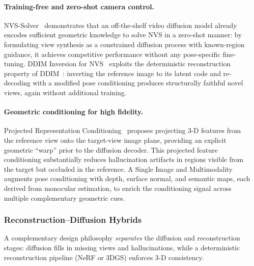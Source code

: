 \paragraph{Training-free and zero-shot camera control.}
NVS-Solver~\citep{you2024nvssolver} demonstrates that an off-the-shelf video
diffusion model already encodes sufficient geometric knowledge to solve
NVS in a zero-shot manner: by formulating view synthesis as a constrained
diffusion process with known-region guidance, it achieves competitive performance
without any pose-specific fine-tuning.
DDIM Inversion for NVS~\citep{xu2024ddim_nvs} exploits the deterministic
reconstruction property of DDIM~\citep{song2020ddim}: inverting the reference
image to its latent code and re-decoding with a modified pose conditioning
produces structurally faithful novel views, again without additional training.

\paragraph{Geometric conditioning for high fidelity.}
Projected Representation Conditioning~\citep{han2024prc} proposes projecting
3-D features from the reference view onto the target-view image plane,
providing an explicit geometric ``warp'' prior to the diffusion decoder.
This projected feature conditioning substantially reduces hallucination artifacts
in regions visible from the target but occluded in the reference.
A Single Image and Multimodality~\citep{tang2024smm} augments pose conditioning
with depth, surface normal, and semantic maps, each derived from monocular
estimation, to enrich the conditioning signal across multiple complementary
geometric cues.

\subsubsection{Reconstruction--Diffusion Hybrids}

A complementary design philosophy \emph{separates} the diffusion and reconstruction
stages: diffusion fills in missing views and hallucinations, while a deterministic
reconstruction pipeline (NeRF or 3DGS) enforces 3-D consistency.

